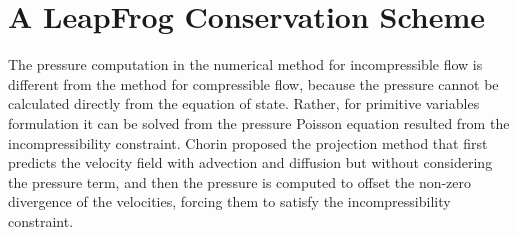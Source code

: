 \normalsize
\section{A LeapFrog Conservation Scheme}


The pressure computation in the numerical method for incompressible flow is different from the method for compressible flow, because the pressure cannot be calculated directly from the equation of state. Rather, for primitive variables formulation it can be solved from the pressure Poisson equation resulted from the incompressibility constraint. Chorin proposed the projection method\cite{Chorin1980} that first predicts the velocity field with advection and diffusion but without considering the pressure term, and then the pressure is computed
to offset the non-zero divergence of the velocities, forcing them to satisfy the incompressibility constraint.

